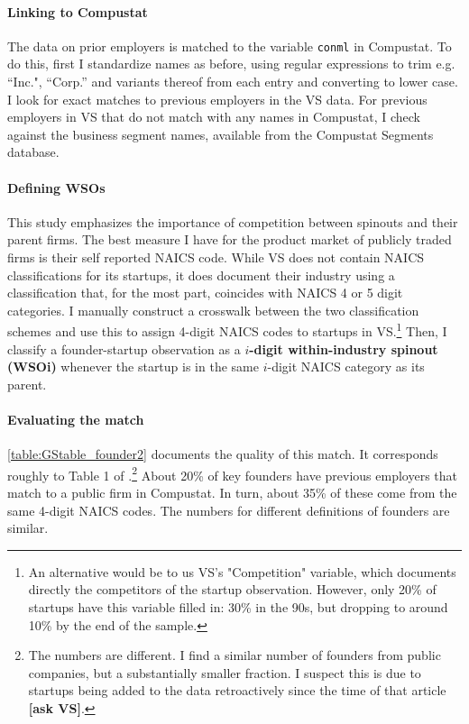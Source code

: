 \documentclass[11pt,english]{article}
\begin{document}




\paragraph{Linking to Compustat}

The data on prior employers is matched to the variable \texttt{conml} in Compustat. To do this, first I standardize names as before, using regular expressions to trim e.g. ``Inc.", ``Corp.'' and variants thereof from each entry and converting to lower case. I look for exact matches to previous employers in the VS data. For previous employers in VS that do not match with any names in Compustat, I check against the business segment names, available from the Compustat Segments database. 

\paragraph{Defining WSOs}

This study emphasizes the importance of competition between spinouts and their parent firms. The best measure I have for the product market of publicly traded firms is their self reported NAICS code. While VS does not contain NAICS classifications for its startups, it does document their industry using a classification that, for the most part, coincides with NAICS 4 or 5 digit categories. I manually construct a crosswalk between the two classification schemes and use this to assign 4-digit NAICS codes to startups in VS.\footnote{An alternative would be to us VS's "Competition" variable, which documents directly the competitors of the startup observation. However, only 20\% of startups have this variable filled in: 30\% in the 90s, but dropping to around 10\% by the end of the sample.} Then, I classify a founder-startup observation as a \textbf{$i$-digit within-industry spinout (WSOi)} whenever the startup is in the same $i$-digit NAICS category as its parent. 

\paragraph{Evaluating the match}

\autoref{table:GStable_founder2} documents the quality of this match. It corresponds roughly to Table 1 of \cite{gompers_entrepreneurial_2005}.\footnote{The numbers are different. I find a similar number of founders from public companies, but a substantially smaller fraction. I suspect this is due to startups being added to the data retroactively since the time of that article \textbf{[ask VS]}.} About 20\% of key founders have previous employers that match to a public firm in Compustat. In turn, about 35\% of these come from the same 4-digit NAICS codes. The numbers for different definitions of founders are similar. 
\end{document}
